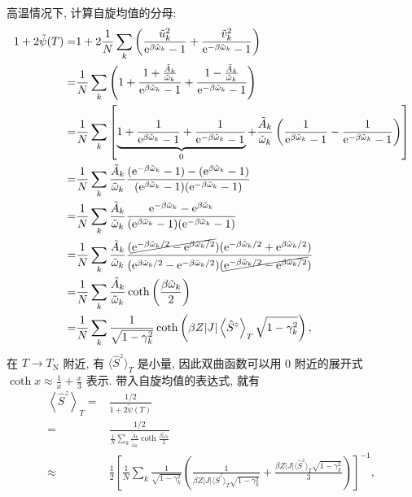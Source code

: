 高温情况下, 计算自旋均值的分母:
\begin{align}
    1+2\tilde{\psi}(T)=&1+2\frac{1}{N}\sum_k\left( \frac{\tilde{u}_k^2}{\mathrm{e}^{\beta\tilde{\omega}_k}-1}+\frac{\tilde{v}_k^2}{\mathrm{e}^{-\beta\tilde{\omega}_k}-1} \right)\nonumber\\
    =&\frac{1}{N}\sum_k\left( 1+\frac{1+\frac{\tilde{A}_k}{\tilde{\omega}_k}}{\mathrm{e}^{\beta\tilde{\omega}_k}-1}+\frac{1-\frac{\tilde{A}_k}{\tilde{\omega}_k}}{\mathrm{e}^{-\beta\tilde{\omega}_k}-1} \right)\nonumber\\
    =&\frac{1}{N}\sum_k\left[ \underbrace{1+\frac{1}{\mathrm{e}^{\beta\tilde{\omega}_k}-1}+\frac{1}{\mathrm{e}^{-\beta\tilde{\omega}_k}-1}}_{0}+\frac{\tilde{A}_k}{\tilde{\omega}_k}\left( \frac{1}{\mathrm{e}^{\beta\tilde{\omega}_k}-1}-\frac{1}{\mathrm{e}^{-\beta\tilde{\omega}_k}-1} \right) \right]\nonumber\\
    =&\frac{1}{N}\sum_k\frac{\tilde{A}_k}{\tilde{\omega}_k}\frac{(\mathrm{e}^{-\beta\tilde{\omega}_k}-1)-(\mathrm{e}^{\beta\tilde{\omega}_k}-1)}{(\mathrm{e}^{\beta\tilde{\omega}_k}-1)(\mathrm{e}^{-\beta\tilde{\omega}_k}-1)}\nonumber\\
    =&\frac{1}{N}\sum_k\frac{\tilde{A}_k}{\tilde{\omega}_k}\frac{\mathrm{e}^{-\beta\tilde{\omega}_k}-\mathrm{e}^{\beta\tilde{\omega}_k}}{(\mathrm{e}^{\beta\tilde{\omega}_k}-1)(\mathrm{e}^{-\beta\tilde{\omega}_k}-1)}\nonumber\\
    =&\frac{1}{N}\sum_k\frac{\tilde{A}_k}{\tilde{\omega}_k}\frac{(\cancel{\mathrm{e}^{-\beta\tilde{\omega}_k/2}-\mathrm{e}^{\beta\tilde{\omega}_k/2}})(\mathrm{e}^{-\beta\tilde{\omega}_k/2}+\mathrm{e}^{\beta\tilde{\omega}_k/2})}{(\mathrm{e}^{\beta\tilde{\omega}_k/2}-\mathrm{e}^{-\beta\tilde{\omega}_k/2})(\cancel{\mathrm{e}^{-\beta\tilde{\omega}_k/2}-\mathrm{e}^{\beta\tilde{\omega}_k/2}})}\nonumber\\
    =&\frac{1}{N}\sum_k\frac{\tilde{A}_k}{\tilde{\omega}_k}\coth\left( \frac{\beta\tilde{\omega}_k}{2} \right)\nonumber\\
    =&\frac{1}{N}\sum_k\frac{1}{\sqrt{1-\gamma_k^2}}\coth\left( \beta Z|J|\left\langle \hat{S}^z \right\rangle_T\sqrt{1-\gamma_k^2} \right),
\end{align}
在 $T\to T_{\mathrm{N}}$ 附近, 有 $\langle \hat{S}^z \rangle_T$ 是小量, 因此双曲函数可以用 0 附近的展开式 $\coth x\approx\frac{1}{x}+\frac{x}{3}$ 表示. 带入自旋均值的表达式, 就有
 \begin{align}
        \left\langle \hat{S}^z \right\rangle_T=&\frac{1/2}{1+2\tilde{\psi}(T)}\nonumber\\
        =&\frac{1/2}{\displaystyle\frac{1}{N}\sum_k\frac{\tilde{A}_k}{\tilde{\omega}_k}\coth \frac{\beta\tilde{\omega}_k}{2}}\nonumber\\
        \approx &\frac{1}{2}\left[ \frac{1}{N}\sum_k\frac{1}{\sqrt{1-\gamma_k^2}}\left(\frac{1}{\beta Z|J|\langle \hat{S}^z\rangle_T\sqrt{1-\gamma_k^2}} +\frac{\beta Z|J|\langle \hat{S}^z \rangle_T\sqrt{1-\gamma_k^2}}{3}\right) \right]^{-1},
    \end{align}

